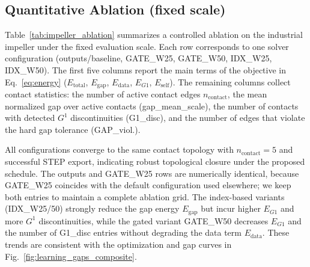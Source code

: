 \documentclass{ieeeaccess}
\begin{document}
\subsection{Quantitative Ablation (fixed scale)}
\label{sec:impeller_ablation}
Table~\ref{tab:impeller_ablation} summarizes a controlled ablation on the
industrial impeller under the fixed evaluation scale. Each row corresponds
to one solver configuration (outputs/baseline, GATE\_W25, GATE\_W50,
IDX\_W25, IDX\_W50). The first five columns report the main terms of the
objective in Eq.~\eqref{eq:energy} ($E_{\text{total}}$, $E_{\text{gap}}$,
$E_{\text{data}}$, $E_{G1}$, $E_{\text{self}}$). The remaining columns
collect contact statistics: the number of active contact edges
$n_{\text{contact}}$, the mean normalized gap over active contacts
(gap\_mean\_scale), the number of contacts with detected $G^1$
discontinuities (G1\_disc), and the number of edges that violate the hard
gap tolerance (GAP\_viol.).

All configurations converge to the same contact topology with
$n_{\text{contact}} = 5$ and successful STEP export, indicating robust
topological closure under the proposed schedule. The outputs and GATE\_W25
rows are numerically identical, because GATE\_W25 coincides with the
default configuration used elsewhere; we keep both entries to maintain a
complete ablation grid. The index-based variants (IDX\_W25/50) strongly
reduce the gap energy $E_{\text{gap}}$ but incur higher $E_{G1}$ and more
$G^1$ discontinuities, while the gated variant GATE\_W50 decreases
$E_{G1}$ and the number of G1\_disc entries without degrading the data term
$E_{\text{data}}$. These trends are consistent with the optimization and
gap curves in Fig.~\ref{fig:learning_gaps_composite}.
\end{document}
